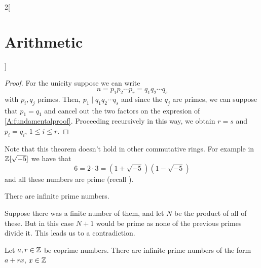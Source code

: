 \documentclass[../../../main_math.tex]{subfiles}
\begin{document}
\begin{multicols}{2}[\section{Arithmetic}]
\begin{proof}
    For the unicity suppose we can write
    \begin{equation}\label{A:fundamentalproof}
      n=p_1p_2\cdots p_r=q_1q_2\cdots q_s
    \end{equation}
    with $p_i,q_j$ primes. Then, $p_1\mid q_1q_2\cdots q_s$ and since the $q_j$ are primes, we can suppose that $p_1=q_1$ and cancel out the two factors on the expresion of \cref{A:fundamentalproof}. Proceeding recursively in this way, we obtain $r=s$ and $p_i=q_i$, $1\leq i\leq r$.
  \end{proof}
  \begin{remark}
    Note that this theorem doesn't hold in other commutative rings. For example in $\mathbb{Z}[\sqrt{-5}]$ we have that $$6=2\cdot 3=(1+\sqrt{-5})(1-\sqrt{-5})$$
    and all these numbers are prime (recall ).
  \end{remark}
  \begin{theorem}
    There are infinite prime numbers.
  \end{theorem}
  \begin{sproof}
    Suppose there was a finite number of them, and let $N$ be the product of all of these. But in this case $N+1$ would be prime as none of the previous primes divide it. This leads us to a contradiction.
  \end{sproof}
  \begin{theorem}
    Let $a,r\in\mathbb{Z}$ be coprime numbers. There are infinite prime numbers of the form $a+rx$, $x\in \mathbb{Z}$
  \end{theorem}

\end{multicols}
\end{document}
